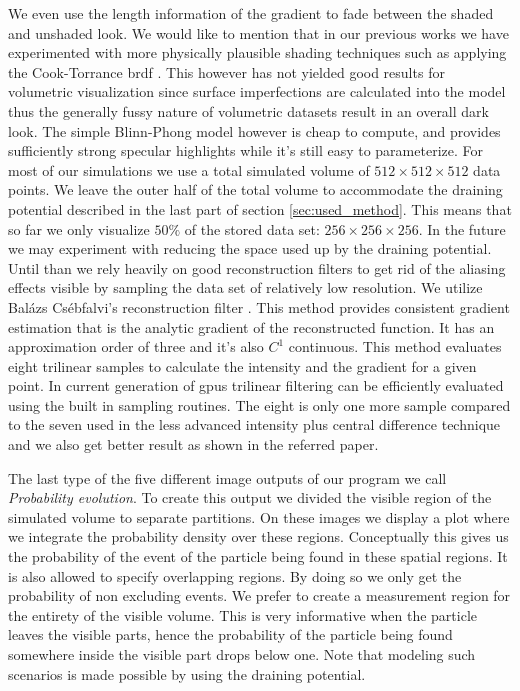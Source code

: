 We even use the length information of the gradient to fade between the shaded and unshaded look.
We would like to mention that in our previous works we have experimented with more physically plausible shading techniques such as applying the Cook-Torrance \acrfull{brdf} \cite{CookTorrance1982}.
This however has not yielded good results for volumetric visualization since surface imperfections are calculated into the model thus the generally fussy nature of volumetric datasets result in an overall dark look.
The simple Blinn-Phong model however is cheap to compute, and provides sufficiently strong specular highlights while it's still easy to parameterize.
For most of our simulations we use a total simulated volume of $512\times 512 \times 512$ data points.
We leave the outer half of the total volume to accommodate the draining potential described in the last part of section \ref{sec:used_method}.
This means that so far we only visualize $50\%$ of the stored data set: $256 \times 256 \times 256$.
In the future we may experiment with reducing the space used up by the draining potential.
Until than we rely heavily on good reconstruction filters to get rid of the aliasing effects visible by sampling the data set of relatively low resolution.
We utilize Balázs Csébfalvi's reconstruction filter \cite{csebfalvi2023}.
This method provides consistent gradient estimation that is the analytic gradient of the reconstructed function.
It has an approximation order of three and it's also $C^1$ continuous.
This method evaluates eight trilinear samples to calculate the intensity and the gradient for a given point.
In current generation of \acrshort{gpu}s trilinear filtering can be efficiently evaluated using the built in sampling routines.
The eight is only one more sample compared to the seven used in the less advanced intensity plus central difference technique and we also get better result as shown in the referred paper.

The last type of the five different image outputs of our program we call \textit{Probability evolution}.
To create this output we divided the visible region of the simulated volume to separate partitions.
On these images we display a plot where we integrate the probability density over these regions.
Conceptually this gives us the probability of the event of the particle being found in these spatial regions.
It is also allowed to specify overlapping regions.
By doing so we only get the probability of non excluding events.
We prefer to create a measurement region for the entirety of the visible volume.
This is very informative when the particle leaves the visible parts, hence the probability of the particle being found somewhere inside the visible part drops below one.
Note that modeling such scenarios is made possible by using the draining potential.


